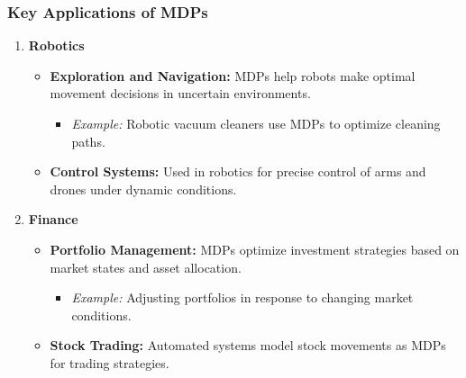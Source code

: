\documentclass[aspectratio=169]{beamer}
\begin{document}
\begin{frame}[fragile]
  \frametitle{Key Applications of MDPs}
  \begin{enumerate}
    \item \textbf{Robotics}
      \begin{itemize}
        \item \textbf{Exploration and Navigation:} MDPs help robots make optimal movement decisions in uncertain environments.
          \begin{itemize}
            \item \textit{Example:} Robotic vacuum cleaners use MDPs to optimize cleaning paths.
          \end{itemize}
        \item \textbf{Control Systems:} Used in robotics for precise control of arms and drones under dynamic conditions.
      \end{itemize}
      
    \item \textbf{Finance}
      \begin{itemize}
        \item \textbf{Portfolio Management:} MDPs optimize investment strategies based on market states and asset allocation.
          \begin{itemize}
            \item \textit{Example:} Adjusting portfolios in response to changing market conditions.
          \end{itemize}
        \item \textbf{Stock Trading:} Automated systems model stock movements as MDPs for trading strategies.
      \end{itemize}
  \end{enumerate}
\end{frame}
\end{document}
